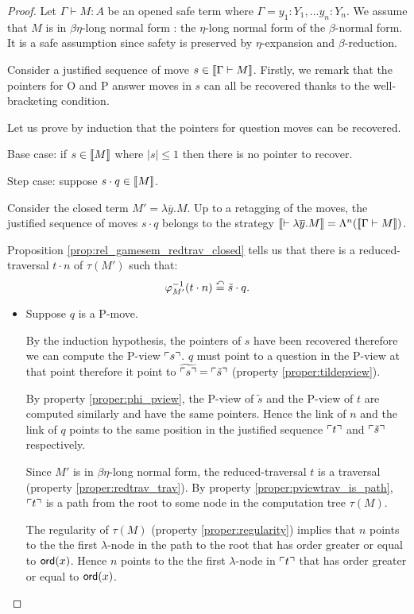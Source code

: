 \begin{proof}
Let $\Gamma \vdash M : A$ be an opened safe term where $\Gamma = y_1:Y_1, \ldots y_n:Y_n$.
We assume that $M$ is in $\beta \eta$-long normal form : the $\eta$-long normal form of the $\beta$-normal form.
It is a safe assumption since safety is preserved by $\eta$-expansion and $\beta$-reduction.

Consider a justified sequence of move $s \in {[\![\Gamma \vdash M ]\!]}$. Firstly,
we remark that the pointers for O and P answer moves in $s$ can all be
recovered thanks to the well-bracketing condition.

Let us prove by induction that the pointers for question moves can be recovered.

Base case: if $s \in {[\![M ]\!]}$ where $|s| \leq 1$ then there is no pointer to recover.

Step case: suppose $s\cdot q \in {[\![M ]\!]}$.

Consider the closed term $M'  = \lambda \overline{y} . M$.
Up to a retagging of the moves, the justified sequence of moves $s \cdot q$ belongs to the strategy
${[\![ \vdash \lambda \overline{y} . M ]\!]} = \Lambda^n({[\![ \Gamma \vdash M ]\!]})$.

Proposition \ref{prop:rel_gamesem_redtrav_closed} tells us that
there is a reduced-traversal $t \cdot n$ of $\tau(M')$ such that:
$$\varphi^{-1}_{M'}(t \cdot n) \stackrel{\curvearrowleft}{=} \tilde{s} \cdot q.$$

\begin{itemize}
\item Suppose $q$ is a P-move.

By the induction hypothesis, the pointers of $s$ have been recovered therefore we can compute the P-view $\ulcorner s \urcorner$.
$q$ must point to a question in the P-view at that point therefore it point to $\widetilde{\ulcorner s \urcorner} = \ulcorner \tilde{s} \urcorner$
(property \ref{proper:tildepview}).


By property \ref{proper:phi_pview}, the P-view of $\tilde{s}$ and the P-view of $t$ are computed
similarly and have the same pointers. Hence the link
of $n$ and the link of $q$ points to the same position in
the justified sequence $\ulcorner t \urcorner$ and $\ulcorner \tilde{s} \urcorner$ respectively.

Since $M'$ is in $\beta \eta$-long normal form, the reduced-traversal $t$ is a traversal
(property \ref{proper:redtrav_trav}).
By property \ref{proper:pviewtrav_is_path}, $\ulcorner t \urcorner$ is a path from the root to some node
in the computation tree $\tau(M)$.

The regularity of $\tau(M)$ (property \ref{proper:regularity}) implies that $n$ points to the
the first $\lambda$-node in the path to the root that has order greater or equal to ${\sf ord}(x)$.
Hence $n$ points to the the first $\lambda$-node in $\ulcorner t \urcorner$ that
has order greater or equal to ${\sf ord}(x)$.


\end{itemize}
\end{proof}
